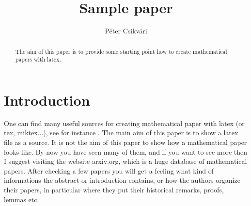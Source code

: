 \documentclass[12pt,a4paper]{amsart}
\numberwithin{equation}{section}
\theoremstyle{plain}
\theoremstyle{definition}
\begin{document}
\title{Sample paper}


\author[P. Csikv\'ari]{P\'{e}ter Csikv\'{a}ri}

\address{Massachusetts Institute of Technology \\ Department of Mathematics \\
Cambridge MA 02139 \&  E\"{o}tv\"{o}s Lor\'{a}nd University \\ Department of Computer 
Science \\ H-1117 Budapest
\\ P\'{a}zm\'{a}ny P\'{e}ter s\'{e}t\'{a}ny 1/C \\ Hungary} 





















\begin{abstract} The aim of this paper is to provide some starting point how to create mathematical papers with latex.
\end{abstract}

\maketitle

\section{Introduction} One can find many useful sources for creating mathematical paper with latex (or tex, miktex...), see for instance \cite{wilk, wiki}. The main aim of this paper is to show a latex file as a source. It is not the aim of this paper to show how a mathematical paper looks like. By now you have seen many of them, and if you want to see more then I suggest visiting the website arxiv.org, which is a huge database of mathematical papers. After checking a few papers you will get a feeling what kind of informations the abstract or introduction contains, or how the authors organize their papers, in particular where they put their historical remarks, proofs, lemmas etc. 
\end{document}
